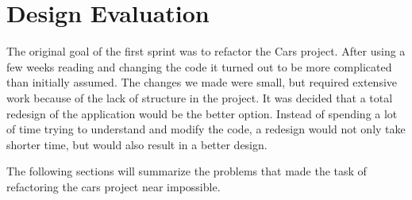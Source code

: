 \section{Design Evaluation}
The original goal of the first sprint was to refactor the Cars project. 
After using a few weeks reading and changing the code it turned out to be more complicated than initially assumed.
The changes we made were small, but required extensive work because of the lack of structure in the project.
It was decided that a total redesign of the application would be the better option.
Instead of spending a lot of time trying to understand and modify the code, a redesign would not only take shorter time, but would also result in a better design.

The following sections will summarize the problems that made the task of refactoring the cars project near impossible.